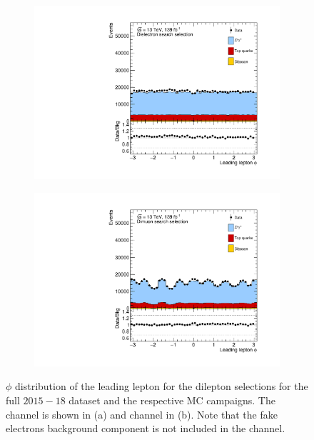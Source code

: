 \begin{figure}[]
    \centering
    \begin{subfigure}[b]{0.49\textwidth}
        \centering
        \includegraphics[width=\textwidth]{figures/analysis/datamc/dataMCcompare/ee_phi1.pdf}
        \caption{}
        \label{fig:datamc:eephi1}
    \end{subfigure}
    \begin{subfigure}[b]{0.49\textwidth}
        \centering
        \includegraphics[width=\textwidth]{figures/analysis/datamc/dataMCcompare/uu_phi1.pdf}
        \caption{}
        \label{fig:datamc:uuphi1}
    \end{subfigure}
    \caption[$\phi$ distribution of the leading lepton for the dilepton selections for the full $2015-18$ dataset and the respective MC campaigns.]{$\phi$ distribution of the leading lepton for the dilepton selections for the full $2015-18$ dataset and the respective MC campaigns. The \ee channel is shown in (a) and \mumu channel in (b). Note that the fake electrons background component is not included in the \ee channel.}
    \label{fig:datamc:phi1}
\end{figure}

